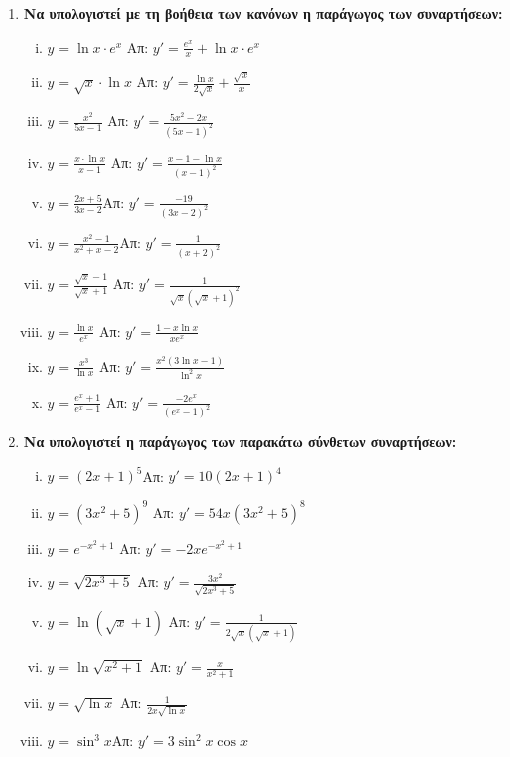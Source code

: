 \begin{enumerate}
  \item {\bfseries Να υπολογιστεί με τη βοήθεια των κανόνων η παράγωγος των συναρτήσεων:}
    \begin{enumerate}[i)]
      \item $ y= \ln{x} \cdot e^{x} $ 
        \hfill Απ: $ y'= \frac{e^{x}}{x} + \ln{x}\cdot e^{x} $ 
      \item $ y= \sqrt{x}\cdot \ln{x} $ 
        \hfill Απ: $ y'= \frac{\ln{x}}{2 \sqrt{ x }}  + \frac{\sqrt{ x }}{x} $ 
      \item $ y= \frac{x^{2}}{5x-1} $ \hfill Απ: $ y'= \frac{5x^{2}-2x}{(5x-1)^{2}} $  
      \item $ y = \frac{x\cdot \ln{x}}{x-1} $ 
        \hfill Απ: $ y' = \frac{x-1- \ln{x}}{(x-1)^{2}} $ 
      \item $y=\frac{2x+5}{3x-2}$\hfill Απ: $y'=\frac{-19}{(3x-2)^2}$
      \item $y=\frac{x^2-1}{x^2+x-2}$\hfill Απ: $y'=\frac{1}{(x+2)^2}$
      \item $y=\frac{\sqrt{x}-1}{\sqrt{x}+1}$
        \hfill Απ: $y'=\frac{1}{\sqrt{x}(\sqrt{x}+1)^2}$
      \item $ y= \frac{\ln{x}}{e^{x}} $ \hfill Απ: $ y'= \frac{1 - x \ln{x}}{xe^{x}} $ 
      \item $ y= \frac{x^{3}}{\ln{x}} $ 
        \hfill Απ: $ y' = \frac{x^{2}(3 \ln{x} -1)}{\ln^{2}{x} } $ 
      \item $ y= \frac{e^{x}+1}{e^{x}-1} $ 
        \hfill Απ: $ y'= \frac{-2e^{x}}{(e^{x}-1)^{2}} $ 
    \end{enumerate}

  \item {\bfseries Να υπολογιστεί η παράγωγος των παρακάτω σύνθετων συναρτήσεων:}
    \begin{enumerate}[i)]
      \item $y=(2x+1)^5$\hfill Απ: $y'=10(2x+1)^4$
      \item $ y=(3x^{2}+5)^{9} $ \hfill Απ: $ y'=54x(3x^{2}+5)^{8} $ 
      \item $ y=e^{-x^{2}+1} $ \hfill Απ: $ y'=-2x e^{-x^{2}+1} $ 
      \item $ y= \sqrt{2x^{3}+5} $ \hfill Απ: $ y'= \frac{3x^{2}}{\sqrt{2x^{3}+5}} $ 
      \item $ y= \ln{(\sqrt{ x } +1)} $ 
        \hfill Απ: $ y'= \frac{1}{2 \sqrt{ x } (\sqrt{ x } +1)} $ 
      \item $y= \ln{\sqrt{x^{2}+1}} $ \hfill Απ: $ y'= \frac{x}{x^{2}+1} $ 
      \item $ y= \sqrt{ \ln{x} } $ \hfill Απ: $ \frac{1}{2x \sqrt{ \ln{x} }} $ 
      \item $y=\sin^3 x$\hfill Απ: $y'=3\sin^2x \cos x$
    \end{enumerate}
\end{enumerate}








